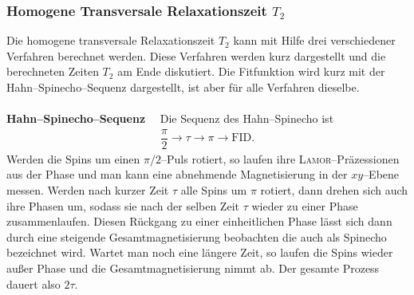 \documentclass[10pt]{article}
\begin{document}
\begin{multicols}{2}
\subsubsection{Homogene Transversale Relaxationszeit $T_2$}
Die homogene transversale Relaxationszeit $T_2$ kann mit Hilfe drei verschiedener Verfahren berechnet werden.
Diese Verfahren werden kurz dargestellt und die berechneten Zeiten $T_2$ am Ende diskutiert.
Die Fitfunktion wird kurz mit der Hahn--Spinecho--Sequenz dargestellt, ist aber für alle Verfahren dieselbe.
\\\\\textbf{Hahn--Spinecho--Sequenz}$\quad$
Die Sequenz des Hahn--Spinecho ist
\begin{align} 
        \dfrac{\pi }{2}\rightarrow \tau \rightarrow \pi \rightarrow \text{FID}
.\end{align} 
Werden die Spins um einen $\pi /2$--Puls rotiert, so laufen ihre \textsc{Lamor}--Präzessionen aus der Phase und man kann eine abnehmende Magnetisierung in der $xy$--Ebene messen.
Werden nach kurzer Zeit $\tau $ alle Spins um $\pi $ rotiert, dann drehen sich auch ihre Phasen um, sodass sie nach der selben Zeit $\tau $ wieder zu einer Phase zusammenlaufen.
Diesen Rückgang zu einer einheitlichen Phase lässt sich dann durch eine steigende Gesamtmagnetisierung beobachten die auch als Spinecho bezeichnet wird.
Wartet man noch eine längere Zeit, so laufen die Spins wieder außer Phase und die Gesamtmagnetisierung nimmt ab.
Der gesamte Prozess dauert also $2\tau $.


\end{multicols}
\end{document}
